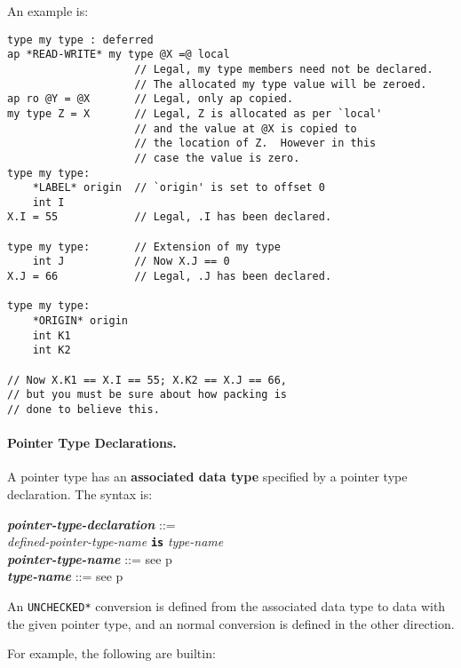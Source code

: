\documentclass[12pt]{article}
\newcommand{\subsubsubsection}[1]{\paragraph[#1]{#1.}}
\newcommand{\TT}[1]{{\tt \bfseries #1}}
\newcommand{\key}[1]{{\rm \bfseries #1}}
\newcommand{\ttkey}[1]{{\tt \bfseries #1}}
\newcommand{\emkey}[1]{{\em \bfseries #1}}
\newcommand{\pagref}[1]{p\pageref{#1}}
\newenvironment{indpar}[1][0.3in]%
	{\begin{list}{}%
		     {\setlength{\itemsep}{0in}%
		      \setlength{\topsep}{0in}%
		      \setlength{\parsep}{1ex}%
		      \setlength{\labelwidth}{#1}%
		      \setlength{\leftmargin}{#1}%
		      \addtolength{\leftmargin}{\labelsep}}%
	 \item}%
	{\end{list}}
\begin{document}
An example is:

\begin{indpar}\begin{verbatim}
type my type : deferred
ap *READ-WRITE* my type @X =@ local
                    // Legal, my type members need not be declared.
                    // The allocated my type value will be zeroed.
ap ro @Y = @X       // Legal, only ap copied.
my type Z = X       // Legal, Z is allocated as per `local'
                    // and the value at @X is copied to
                    // the location of Z.  However in this
                    // case the value is zero.
type my type:
    *LABEL* origin  // `origin' is set to offset 0
    int I
X.I = 55            // Legal, .I has been declared.

type my type:       // Extension of my type
    int J           // Now X.J == 0
X.J = 66            // Legal, .J has been declared.

type my type:
    *ORIGIN* origin
    int K1
    int K2

// Now X.K1 == X.I == 55; X.K2 == X.J == 66,
// but you must be sure about how packing is
// done to believe this.
\end{verbatim}\end{indpar}

\subsubsubsection{Pointer Type Declarations}
\label{POINTER-TYPE-DECLARATIONS}

A pointer type has an
\key{associated data type}\label{POINTER-ASSOCIATE}
specified by a pointer type declaration.  The syntax is:

\begin{indpar}
\emkey{pointer-type-declaration}\label{POINTER-TYPE-DECLARATION} ::= \\
\hspace*{0.5in}\ttkey{pointer type} {\em defined-pointer-type-name}
	       \TT{is} {\em type-name}
\\[0.5ex]
\emkey{pointer-type-name} ::= see \pagref{POINTER-TYPE-NAME}
\\[0.5ex]
\emkey{type-name} ::= see \pagref{TYPE-NAME}
\end{indpar}
An {\tt *UNCHECKED*} conversion is defined from the associated data
type to data with the given pointer type, and an normal conversion
is defined in the other direction.

For example, the following are builtin:
\end{document}

